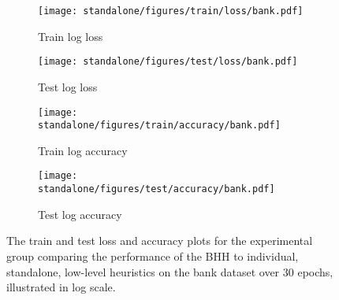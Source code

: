 \begin{figure}[H]
	\begin{subfigure}{0.5\textwidth}
		\centering
		\texttt{[image: standalone/figures/train/loss/bank.pdf]}
		\caption{Train log loss}
		\label{fig:results:standalone:figures:loss:train:bank}
	\end{subfigure}
	\begin{subfigure}{0.5\textwidth}
		\centering
		\texttt{[image: standalone/figures/test/loss/bank.pdf]}
		\caption{Test log loss}
		\label{fig:results:standalone:figures:loss:test:bank}
	\end{subfigure}
	\par\bigskip
	\begin{subfigure}{0.5\textwidth}
		\centering
		\texttt{[image: standalone/figures/train/accuracy/bank.pdf]}
		\caption{Train log accuracy}
		\label{fig:results:standalone:figures:accuracy:train:bank}
	\end{subfigure}
	\begin{subfigure}{0.5\textwidth}
		\centering
		\texttt{[image: standalone/figures/test/accuracy/bank.pdf]}
		\caption{Test log accuracy}
		\label{fig:results:standalone:figures:accuracy:test:bank}
	\end{subfigure}
	\par\bigskip
	\caption{The train and test loss and accuracy plots for the experimental group comparing the performance of the \acs{BHH} to individual, standalone, low-level heuristics on the bank dataset over 30 epochs, illustrated in log scale.}
	\label{fig:results:standalone:figures:bank}
\end{figure}

